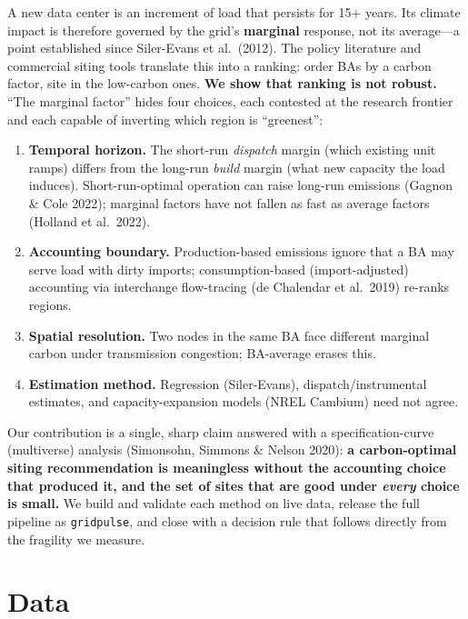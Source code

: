 \documentclass[11pt]{article}
\begin{document}
A new data center is an increment of load that persists for 15+ years. Its climate
impact is therefore governed by the grid's \textbf{marginal} response, not its
average---a point established since Siler-Evans et al.\ (2012). The policy
literature and commercial siting tools translate this into a ranking: order BAs by
a carbon factor, site in the low-carbon ones. \textbf{We show that ranking is not
robust.} ``The marginal factor'' hides four choices, each contested at the
research frontier and each capable of inverting which region is ``greenest'':

\begin{enumerate}
\item \textbf{Temporal horizon.} The short-run \emph{dispatch} margin (which
existing unit ramps) differs from the long-run \emph{build} margin (what new
capacity the load induces). Short-run-optimal operation can raise long-run
emissions (Gagnon \& Cole 2022); marginal factors have not fallen
as fast as average factors (Holland et al.\ 2022).
\item \textbf{Accounting boundary.} Production-based emissions ignore that a BA may
serve load with dirty imports; consumption-based (import-adjusted) accounting via
interchange flow-tracing (de Chalendar et al.\ 2019) re-ranks regions.
\item \textbf{Spatial resolution.} Two nodes in the same BA face different marginal
carbon under transmission congestion; BA-average erases this.
\item \textbf{Estimation method.} Regression (Siler-Evans), dispatch/instrumental
estimates, and capacity-expansion models (NREL Cambium) need not agree.
\end{enumerate}

Our contribution is a single, sharp claim answered with a specification-curve
(multiverse) analysis (Simonsohn, Simmons \& Nelson 2020): \textbf{a
carbon-optimal siting recommendation is meaningless without the accounting choice
that produced it, and the set of sites that are good under \emph{every} choice is
small.} We build and validate each method on live data, release the full pipeline
as \texttt{gridpulse}, and close with a decision rule that follows directly from
the fragility we measure.

\section{Data}
\end{document}
